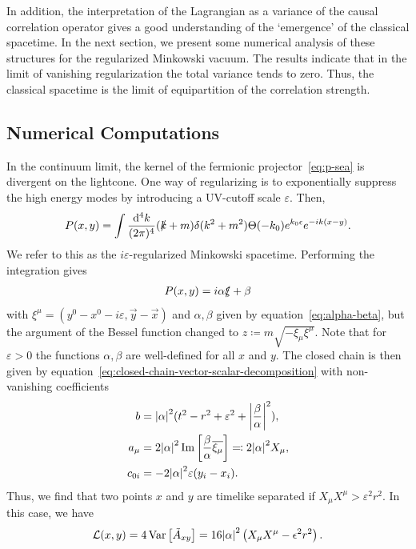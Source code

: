 \documentclass[reqno,11pt]{amsart}
\DeclareMathOperator{\Var}{Var}
\newcommand{\defeq}{\coloneqq}
\newcommand{\eqdef}{\eqqcolon}
\newcommand{\complexconj}[1]{\overline{#1}}
\renewcommand{\L}{{\mathcal{L}}}
\numberwithin{equation}{section}
\begin{document}
In addition, the interpretation of the Lagrangian as a variance of the causal correlation operator gives a good understanding
of the `emergence' of the classical spacetime.
In the next section, we present some numerical analysis of these structures for the regularized Minkowski vacuum.
The results indicate that in the limit of vanishing regularization the total variance tends to zero.
Thus, the classical spacetime is the limit of equipartition of the correlation strength.

% 
\subsection{Numerical Computations}\label{subsec:numerical-computations}

In the continuum limit, the kernel of the fermionic projector~\eqref{eq:p-sea}
is divergent on the lightcone.
One way of regularizing is to exponentially suppress the high energy modes by introducing a UV-cutoff scale $\varepsilon$.
Then,
\begin{align}
    P(x, y) = \int \frac{\dd^4 k}{(2 \pi)^4} (\slashed{k} + m) \delta(k^2 + m^2) \Theta(-k_0) e^{k_0 \epsilon} e^{- i k (x - y)}.
\end{align}
We refer to this as the $i\varepsilon$-regularized Minkowski spacetime.
Performing the integration gives
\begin{align}
    P(x, y) = i \alpha \slashed{\xi} + \beta
\end{align}
with $\xi^\mu = (y^0 - x^0 - i\varepsilon, \vec{y} - \vec{x})$ and $\alpha, \beta$ given by equation~\eqref{eq:alpha-beta},
but the argument of the Bessel function changed to $z \defeq m \sqrt {- \xi_\mu \xi^\mu}$.
Note that for $\varepsilon > 0$ the functions $\alpha, \beta$ are well-defined for all $x$ and $y$.
The closed chain is then given by equation~\eqref{eq:closed-chain-vector-scalar-decomposition} with non-vanishing coefficients
\begin{align}
    b &= \abs{\alpha}^2 (t^2 - r^2 + \varepsilon^2 + \abs{\frac{\beta}{\alpha}}^2), \\
    a_{\mu} &= 2 \abs{\alpha}^2 \Im \left[ \frac{\beta}{\alpha} \complexconj{\xi_{\mu}} \right] \eqdef 2 \abs{\alpha}^2 X_\mu, \\
    c_{0i} &= - 2 \abs{\alpha}^2 \varepsilon (y_i - x_i).
\end{align}
Thus, we find that two points $x$ and $y$ are timelike separated if $X_\mu X^\mu > \varepsilon^2 r^2$.
In this case, we have
\begin{align}
    \L(x, y) = 4 \Var \left[ \tilde{A}_{xy} \right] = 16 \abs{\alpha}^2 \left( X_\mu X^\mu - \epsilon^2 r^2 \right).
\end{align}
\end{document}
